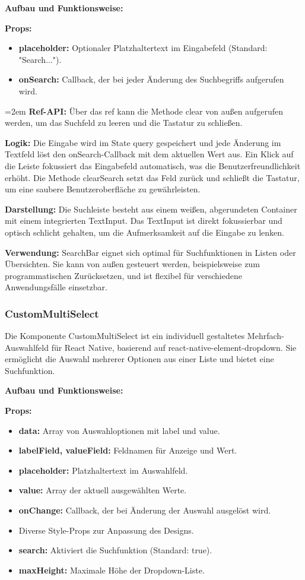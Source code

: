 \noindent\textbf{Aufbau und Funktionsweise:}

\textbf{Props:}
\begin{itemize}
    \item \textbf{placeholder:} Optionaler Platzhaltertext im Eingabefeld (Standard: "Search...").
    \item \textbf{onSearch:} Callback, der bei jeder Änderung des Suchbegriffs aufgerufen wird.
\end{itemize}

\hangindent=2em
\textbf{Ref-API:}
Über das ref kann die Methode clear von außen aufgerufen werden, um das Suchfeld zu leeren und die Tastatur zu schließen.

\textbf{Logik:}
Die Eingabe wird im State query gespeichert und jede Änderung im Textfeld löst den onSearch-Callback mit dem aktuellen Wert aus. Ein Klick auf die Leiste fokussiert das Eingabefeld automatisch, was die Benutzerfreundlichkeit erhöht. Die Methode clearSearch setzt das Feld zurück und schließt die Tastatur, um eine saubere Benutzeroberfläche zu gewährleisten.

\textbf{Darstellung:}
Die Suchleiste besteht aus einem weißen, abgerundeten Container mit einem integrierten TextInput. Das TextInput ist direkt fokussierbar und optisch schlicht gehalten, um die Aufmerksamkeit auf die Eingabe zu lenken.

\noindent\textbf{Verwendung:} SearchBar eignet sich optimal für Suchfunktionen in Listen oder Übersichten. Sie kann von außen gesteuert werden, beispielsweise zum programmatischen Zurücksetzen, und ist flexibel für verschiedene Anwendungsfälle einsetzbar.

\subsubsection{CustomMultiSelect}
Die Komponente CustomMultiSelect ist ein individuell gestaltetes Mehrfach-Auswahlfeld für React Native, basierend auf react-native-element-dropdown. Sie ermöglicht die Auswahl mehrerer Optionen aus einer Liste und bietet eine Suchfunktion.

\noindent\textbf{Aufbau und Funktionsweise:}

\textbf{Props:}
\begin{itemize}
    \item \textbf{data:} Array von Auswahloptionen mit label und value.
    \item \textbf{labelField, valueField:} Feldnamen für Anzeige und Wert.
    \item \textbf{placeholder:} Platzhaltertext im Auswahlfeld.
    \item \textbf{value:} Array der aktuell ausgewählten Werte.
    \item \textbf{onChange:} Callback, der bei Änderung der Auswahl ausgelöst wird.
    \item Diverse Style-Props zur Anpassung des Designs.
    \item \textbf{search:} Aktiviert die Suchfunktion (Standard: true).
    \item \textbf{maxHeight:} Maximale Höhe der Dropdown-Liste.
\end{itemize}


